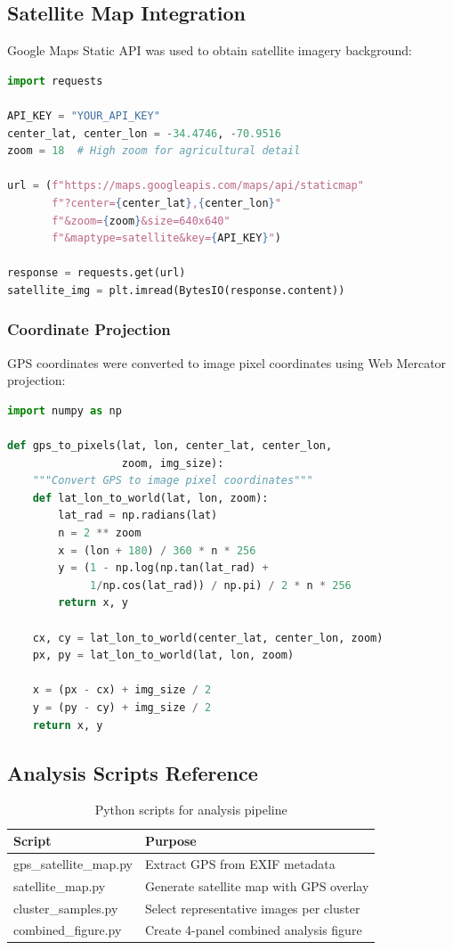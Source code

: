 \subsection{Satellite Map Integration}

Google Maps Static API was used to obtain satellite imagery background:

\begin{lstlisting}[language=Python]
import requests

API_KEY = "YOUR_API_KEY"
center_lat, center_lon = -34.4746, -70.9516
zoom = 18  # High zoom for agricultural detail

url = (f"https://maps.googleapis.com/maps/api/staticmap"
       f"?center={center_lat},{center_lon}"
       f"&zoom={zoom}&size=640x640"
       f"&maptype=satellite&key={API_KEY}")

response = requests.get(url)
satellite_img = plt.imread(BytesIO(response.content))
\end{lstlisting}

\subsubsection{Coordinate Projection}

GPS coordinates were converted to image pixel coordinates using Web Mercator projection:

\begin{lstlisting}[language=Python]
import numpy as np

def gps_to_pixels(lat, lon, center_lat, center_lon,
                  zoom, img_size):
    """Convert GPS to image pixel coordinates"""
    def lat_lon_to_world(lat, lon, zoom):
        lat_rad = np.radians(lat)
        n = 2 ** zoom
        x = (lon + 180) / 360 * n * 256
        y = (1 - np.log(np.tan(lat_rad) +
             1/np.cos(lat_rad)) / np.pi) / 2 * n * 256
        return x, y

    cx, cy = lat_lon_to_world(center_lat, center_lon, zoom)
    px, py = lat_lon_to_world(lat, lon, zoom)

    x = (px - cx) + img_size / 2
    y = (py - cy) + img_size / 2
    return x, y
\end{lstlisting}

\subsection{Analysis Scripts Reference}

\begin{table}[H]
\centering
\caption{Python scripts for analysis pipeline}
\begin{tabular}{ll}
\toprule
\textbf{Script} & \textbf{Purpose} \\
\midrule
gps\_satellite\_map.py & Extract GPS from EXIF metadata \\
satellite\_map.py & Generate satellite map with GPS overlay \\
cluster\_samples.py & Select representative images per cluster \\
combined\_figure.py & Create 4-panel combined analysis figure \\
\bottomrule
\end{tabular}
\end{table}

